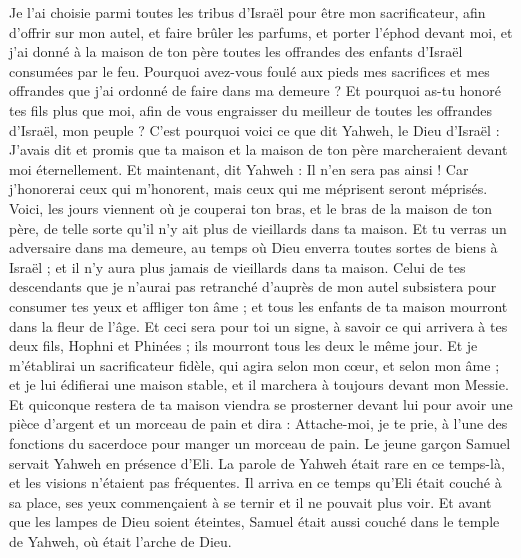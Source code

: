 \begin{multicols}{2}
Je l'ai choisie parmi toutes les tribus d'Israël pour être mon sacrificateur, afin d'offrir sur mon autel, et faire brûler les parfums, et porter l'éphod devant moi, et j'ai donné à la maison de ton père toutes les offrandes des enfants d'Israël consumées par le feu.
Pourquoi avez-vous foulé aux pieds mes sacrifices et mes offrandes que j'ai ordonné de faire dans ma demeure ? Et pourquoi as-tu honoré tes fils plus que moi, afin de vous engraisser du meilleur de toutes les offrandes d'Israël, mon peuple ?
C'est pourquoi voici ce que dit Yahweh, le Dieu d'Israël : J'avais dit et promis que ta maison et la maison de ton père marcheraient devant moi éternellement. Et maintenant, dit Yahweh : Il n’en sera pas ainsi ! Car j'honorerai ceux qui m'honorent, mais ceux qui me méprisent seront méprisés.
Voici, les jours viennent où je couperai ton bras, et le bras de la maison de ton père, de telle sorte qu'il n'y ait plus de vieillards dans ta maison.
Et tu verras un adversaire dans ma demeure, au temps où Dieu enverra toutes sortes de biens à Israël ; et il n'y aura plus jamais de vieillards dans ta maison.
Celui de tes descendants que je n'aurai pas retranché d'auprès de mon autel subsistera pour consumer tes yeux et affliger ton âme ; et tous les enfants de ta maison mourront dans la fleur de l'âge.
Et ceci sera pour toi un signe, à savoir ce qui arrivera à tes deux fils, Hophni et Phinées ; ils mourront tous les deux le même jour.
Et je m'établirai un sacrificateur fidèle, qui agira selon mon cœur, et selon mon âme ; et je lui édifierai une maison stable, et il marchera à toujours devant mon Messie.
Et quiconque restera de ta maison viendra se prosterner devant lui pour avoir une pièce d'argent et un morceau de pain et dira : Attache-moi, je te prie, à l’une des fonctions du sacerdoce pour manger un morceau de pain.
\VerseOne{}Le jeune garçon Samuel servait Yahweh en présence d'Eli. La parole de Yahweh était rare en ce temps-là, et les visions n’étaient pas fréquentes.
Il arriva en ce temps qu'Eli était couché à sa place, ses yeux commençaient à se ternir et il ne pouvait plus voir.
Et avant que les lampes de Dieu soient éteintes, Samuel était aussi couché dans le temple de Yahweh, où était l'arche de Dieu.

\end{multicols}
